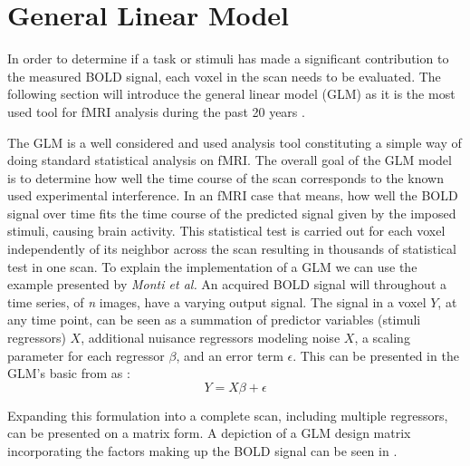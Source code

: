 \section{General Linear Model}

In order to determine if a task or stimuli has made a significant contribution to the measured BOLD signal, each voxel in the scan needs to be evaluated. The following section will introduce the general linear model (GLM) as it is the most used tool for fMRI analysis during the past 20 years \cite{Poline2012}. 

The GLM is a well considered and used analysis tool constituting a simple way of doing standard statistical analysis on fMRI. The overall goal of the GLM model is to determine how well the time course of the scan corresponds to the known used experimental interference.  In an fMRI case that means, how well the BOLD signal over time fits the time course of the predicted signal given by the imposed stimuli, causing brain activity. This statistical test is carried out for each voxel independently of its neighbor across the scan resulting in thousands of statistical test in one scan. \cite{Moayedi2018,Monti2011} To explain the implementation of a GLM we can use the example presented by \textit{Monti et al.} An acquired BOLD signal will throughout a time series, of \textit{n} images, have a varying output signal. The signal in a voxel $Y$, at any time point, can be seen as a summation of predictor variables (stimuli regressors) $X$,  additional nuisance regressors modeling noise $X$, a scaling parameter for each regressor $\beta$, and an error term $\epsilon$. This can be presented in the GLM's basic from as \cite{Monti2011}: 
\begin{equation}
Y=X\beta+\epsilon
\end{equation}

Expanding this formulation into a complete scan, including multiple regressors, can be presented on a matrix form. A depiction of a GLM design matrix incorporating the factors making up the BOLD signal can be seen in . 


